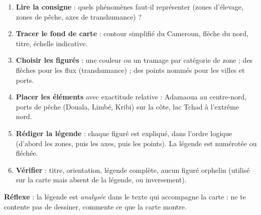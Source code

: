 \documentclass[11pt]{article}
\begin{document}
\begin{methode}
\begin{enumerate}
\item \textbf{Lire la consigne} : quels phénomènes faut-il représenter (zones d'élevage, zones de pêche, axes de transhumance) ?
\item \textbf{Tracer le fond de carte} : contour simplifié du Cameroun, flèche du nord, titre, échelle indicative.
\item \textbf{Choisir les figurés} : une couleur ou un tramage par catégorie de zone ; des flèches pour les flux (transhumance) ; des points nommés pour les villes et ports.
\item \textbf{Placer les éléments} avec exactitude relative : Adamaoua au centre-nord, ports de pêche (Douala, Limbé, Kribi) sur la côte, lac Tchad à l'extrême nord.
\item \textbf{Rédiger la légende} : chaque figuré est expliqué, dans l'ordre logique (d'abord les zones, puis les axes, puis les points). La légende est numérotée ou fléchée.
\item \textbf{Vérifier} : titre, orientation, légende complète, aucun figuré orphelin (utilisé sur la carte mais absent de la légende, ou inversement).
\end{enumerate}
\textbf{Réflexe} : la légende est \emph{analysée} dans le texte qui accompagne la carte : ne te contente pas de dessiner, commente ce que la carte montre.
\end{methode}
\end{document}
